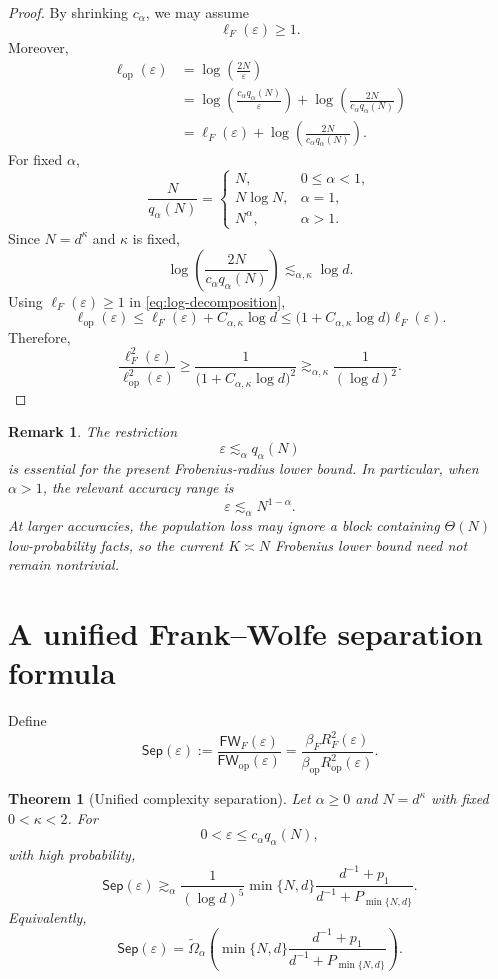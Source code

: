 \documentclass[11pt]{article}
\newtheorem{theorem}{Theorem}
\newtheorem{remark}{Remark}
\newcommand{\op}{\mathrm{op}}
\newcommand{\FW}{\mathsf{FW}}
\newcommand{\Sep}{\mathsf{Sep}}
\newcommand{\eps}{\varepsilon}
\begin{document}
\begin{proof}
By shrinking $c_\alpha$, we may assume
\[
\ell_F(\eps)\ge1.
\]
Moreover,
\begin{align}
\ell_{\op}(\eps)
&= \log\left(\frac{2N}{\eps}\right) \nonumber \\
&= \log\left( \frac{c_\alpha q_\alpha(N)}{\eps} \right) + \log\left( \frac{2N}{c_\alpha q_\alpha(N)} \right) \nonumber \\
&= \ell_F(\eps) + \log\left( \frac{2N}{c_\alpha q_\alpha(N)} \right).
\label{eq:log-decomposition}
\end{align}
For fixed $\alpha$,
\[
\frac{N}{q_\alpha(N)} =
\begin{cases}
N, & 0\le\alpha<1,\\
N\log N, & \alpha=1,\\
N^\alpha, & \alpha>1.
\end{cases}
\]
Since $N=d^\kappa$ and $\kappa$ is fixed,
\[
\log\left( \frac{2N}{c_\alpha q_\alpha(N)} \right) \lesssim_{\alpha,\kappa} \log d.
\]
Using $\ell_F(\eps)\ge1$ in \eqref{eq:log-decomposition},
\[
\ell_{\op}(\eps) \le \ell_F(\eps)+C_{\alpha,\kappa}\log d \le \bigl(1+C_{\alpha,\kappa}\log d\bigr) \ell_F(\eps).
\]
Therefore,
\[
\frac{\ell_F^2(\eps)}{\ell_{\op}^2(\eps)} \ge \frac1{ \bigl(1+C_{\alpha,\kappa}\log d\bigr)^2 } \gtrsim_{\alpha,\kappa} \frac1{(\log d)^2}.
\]
\end{proof}

\begin{remark}
The restriction
\[
\eps\lesssim_\alpha q_\alpha(N)
\]
is essential for the present Frobenius-radius lower bound. In
particular, when $\alpha>1$, the relevant accuracy range is
\[
\eps\lesssim_\alpha N^{1-\alpha}.
\]
At larger accuracies, the population loss may ignore a block
containing $\Theta(N)$ low-probability facts, so the current
$K\asymp N$ Frobenius lower bound need not remain nontrivial.
\end{remark}

\section{A unified Frank--Wolfe separation formula}

Define
\[
\Sep(\eps) := \frac{\FW_F(\eps)}{\FW_{\op}(\eps)} = \frac{\beta_FR_F^2(\eps)} {\beta_{\op}R_{\op}^2(\eps)}.
\]

\begin{theorem}[Unified complexity separation]
\label{thm:unified}
Let $\alpha\ge0$ and $N=d^\kappa$ with fixed $0<\kappa<2$.
For
\[
0<\eps\le c_\alpha q_\alpha(N),
\]
with high probability,
\begin{equation}
\Sep(\eps) \gtrsim_\alpha \frac1{(\log d)^5} \min\{N,d\} \frac{d^{-1}+p_1} {d^{-1}+P_{\min\{N,d\}}}.
\label{eq:explicit-polylog-separation}
\end{equation}
Equivalently,
\begin{equation}
\boxed{
\Sep(\eps) = \widetilde\Omega_\alpha\left( \min\{N,d\} \frac{d^{-1}+p_1} {d^{-1}+P_{\min\{N,d\}}} \right).
}
\label{eq:master-separation}
\end{equation}
\end{theorem}
\end{document}
